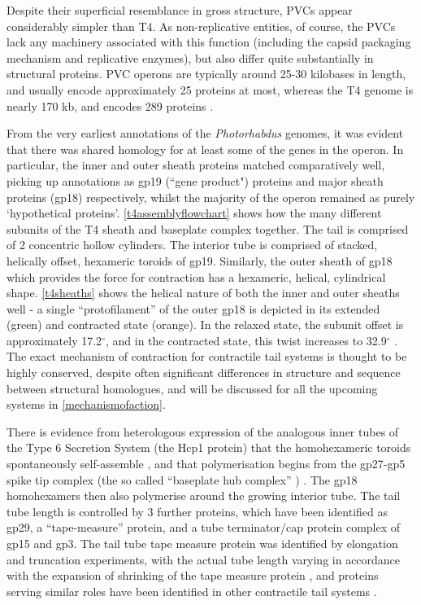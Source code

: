 Despite their superficial resemblance in gross structure, PVCs appear considerably simpler than T4. As non-replicative entities, of course, the PVCs lack any machinery associated with this function (including the capsid packaging mechanism and replicative enzymes), but also differ quite substantially in structural proteins. PVC operons are typically around 25-30 kilobases in length, and usually encode approximately 25 proteins at most, whereas the T4 genome is nearly 170 kb, and encodes 289 proteins \citep{Miller2003}. 

From the very earliest annotations of the \emph{Photorhabdus} genomes, it was evident that there was shared homology for at least some of the genes in the operon. In particular, the inner and outer sheath proteins matched comparatively well, picking up annotations as gp19 (``gene product") proteins and major sheath proteins (gp18) respectively, whilst the majority of the operon remained as purely `hypothetical proteins'.  \vref{t4assemblyflowchart} shows how the many different subunits of the T4 sheath and baseplate complex together. The tail is comprised of 2 concentric hollow cylinders. The interior tube is comprised of stacked, helically offset, hexameric toroids of gp19. Similarly, the outer sheath of gp18 which provides the force for contraction has a hexameric, helical, cylindrical shape. \vref{t4sheaths} shows the helical nature of both the inner and outer sheaths well - a single ``protofilament'' of the outer gp18 is depicted in its extended (green) and contracted state (orange). In the relaxed state, the subunit offset is approximately 17.2$^{\circ}$, and in the contracted state, this twist increases to 32.9$^{\circ}$ \citep{Kube2015a, Kostyuchenko2005, Leiman2004}. The exact mechanism of contraction for contractile tail systems is thought to be highly conserved, despite often significant differences in structure and sequence between structural homologues, and will be discussed for all the upcoming systems in \vref{mechanismofaction}.

There is evidence from heterologous expression of the analogous inner tubes of the Type 6 Secretion System (the Hcp1 protein) that the homohexameric toroids spontaneously self-assemble \citep{Ballister2008}, and that polymerisation begins from the gp27-gp5 spike tip complex (the so called ``baseplate hub complex'' \citep{Lan2014}) \citep{Kanamaru2002}. The gp18 homohexamers then also polymerise around the growing interior tube. The tail tube length is controlled by 3 further proteins, which have been identified as gp29, a ``tape-measure'' protein, and a tube terminator/cap protein complex of gp15 and gp3. The tail tube tape measure protein was identified by elongation and truncation experiments, with the actual tube length varying in accordance with the expansion of shrinking of the tape measure protein \citep{Abuladze1994}, and proteins serving similar roles have been identified in other contractile tail systems \citep{Katsura1987,Katsura1984, Isao1990}.

